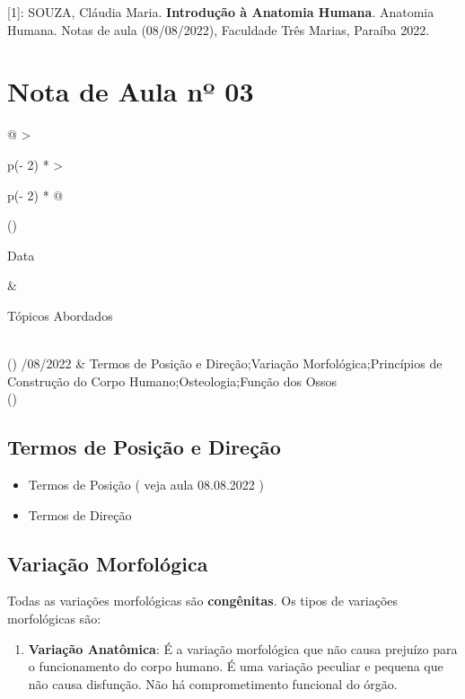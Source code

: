 \documentclass[
]{book}
\providecommand{\tightlist}{%
  \setlength{\itemsep}{0pt}\setlength{\parskip}{0pt}}
\begin{document}
{[}1{]}: SOUZA, Cláudia Maria. \textbf{Introdução à Anatomia Humana}. Anatomia Humana. Notas de aula (08/08/2022), Faculdade Três Marias, Paraíba 2022.

\hypertarget{nota-de-aula-nuxba-03}{%
\section{Nota de Aula nº 03}\label{nota-de-aula-nuxba-03}}

\begin{longtable}[]{@{}
  >{\raggedright\arraybackslash}p{(\columnwidth - 2\tabcolsep) * }
  >{\raggedright\arraybackslash}p{(\columnwidth - 2\tabcolsep) * }@{}}
\toprule()
\begin{minipage}[b]{\linewidth}\raggedright
Data
\end{minipage} & \begin{minipage}[b]{\linewidth}\raggedright
Tópicos Abordados
\end{minipage} \\
\midrule()
/08/2022 & Termos de Posição e Direção;Variação Morfológica;Princípios de Construção do Corpo Humano;Osteologia;Função dos Ossos \\
\bottomrule()
\end{longtable}

\hypertarget{termos-de-posiuxe7uxe3o-e-direuxe7uxe3o-1}{%
\subsection{Termos de Posição e Direção}\label{termos-de-posiuxe7uxe3o-e-direuxe7uxe3o-1}}

\begin{itemize}
\tightlist
\item
  Termos de Posição ( veja aula 08.08.2022 )
\item
  Termos de Direção
\end{itemize}

\hypertarget{variauxe7uxe3o-morfoluxf3gica}{%
\subsection{Variação Morfológica}\label{variauxe7uxe3o-morfoluxf3gica}}

Todas as variações morfológicas são \textbf{congênitas}. Os tipos de variações morfológicas são:

\begin{enumerate}
\def\labelenumi{\arabic{enumi}.}
\tightlist
\item
  \textbf{Variação Anatômica}: É a variação morfológica que não causa prejuízo para o funcionamento do corpo humano. É uma variação peculiar e pequena que não causa disfunção. Não há comprometimento funcional do órgão.
\end{enumerate}
\end{document}
